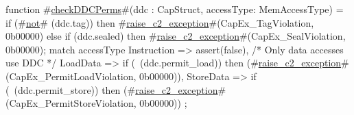 function #\hyperref[zcheckDDCPerms]{checkDDCPerms}#(ddc : CapStruct, accessType: MemAccessType) = 
  {
    if (#\hyperref[znot]{not}# (ddc.tag)) then
      #\hyperref[zraisezyctwozyexception]{raise\_c2\_exception}#(CapEx_TagViolation, 0b00000)
    else if (ddc.sealed) then
      #\hyperref[zraisezyctwozyexception]{raise\_c2\_exception}#(CapEx_SealViolation, 0b00000);
    match accessType {
      Instruction  => assert(false), /* Only data accesses use DDC */
      LoadData     => if (~(ddc.permit_load)) then (#\hyperref[zraisezyctwozyexception]{raise\_c2\_exception}#(CapEx_PermitLoadViolation, 0b00000)),
      StoreData    => if (~(ddc.permit_store)) then (#\hyperref[zraisezyctwozyexception]{raise\_c2\_exception}#(CapEx_PermitStoreViolation, 0b00000))
    };
  }
